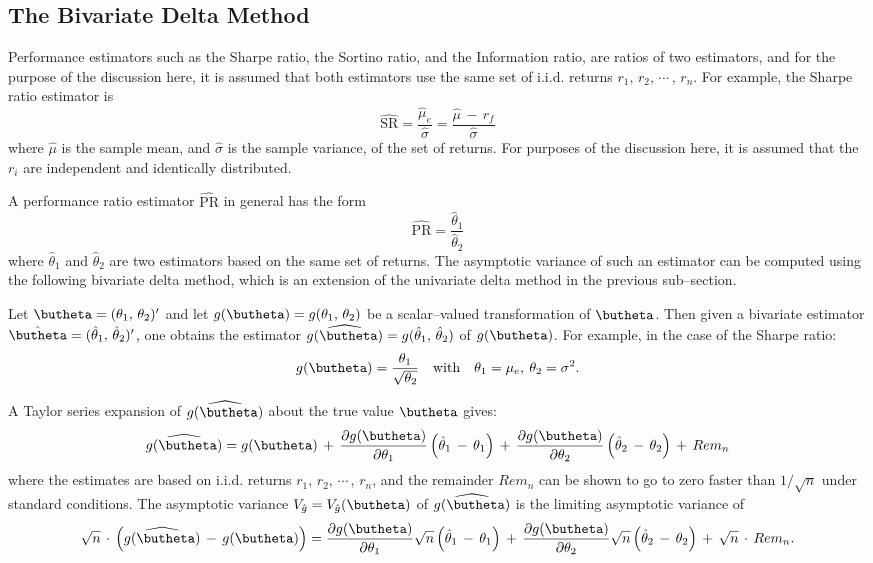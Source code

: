 \documentclass[graybox,envcountchap,sectrefs]{svmono}\usepackage[]{graphicx}\usepackage[]{xcolor}
\begin{document}
\begin{appendices}
\subsection{The Bivariate Delta Method}

Performance estimators such as the Sharpe ratio, the Sortino ratio,
and the Information ratio, are ratios of two estimators, and for the
purpose of the discussion here, it is assumed that both estimators
use the same set of i.i.d. returns $r_{1},\,r_{2},\,\cdots\,,\,r_{n}$.
For example, the Sharpe ratio estimator is
\begin{equation}
\widehat{\mathrm{SR}}=\dfrac{\hat{\mu}_{e}}{\hat{\sigma}}=\dfrac{\hat{\mu}\,-\,r_{f}}{\hat{\sigma}}\label{eq: SRestimator}
\end{equation}
where $\hat{\mu}$ is the sample mean, and $\hat{\sigma}$ is the
sample variance, of the set of returns. For purposes of the discussion
here, it is assumed that the $r_{i}$ are independent and identically
distributed.

A performance ratio estimator $\widehat{\mathrm{PR}}$ in general
has the form
\[
\widehat{\mathrm{PR}}=\dfrac{\hat{\theta}_{1}}{\hat{\theta}_{2}}
\]
where $\hat{\theta}_{1}$ and $\hat{\theta}_{2}$ are two estimators
based on the same set of returns. The asymptotic variance of such
an estimator can be computed using the following bivariate delta method,
which is an extension of the univariate delta method in the previous
sub--section.

Let $\butheta=(\theta_{1},\,\theta_{2})^{\prime}$ and let $g(\butheta)=g(\theta_{1},\,\theta_{2})$
be a scalar--valued transformation of $\butheta$. Then given a bivariate
estimator $\hat{\butheta}=(\hat{\theta}_{1},\,\hat{\theta}_{2})^{\prime}$,
one obtains the estimator $\widehat{g(\butheta)}=g(\hat{\theta}_{1},\,\hat{\theta}_{2})$
of $g(\butheta)$. For example, in the case of the Sharpe ratio:
\begin{equation}
g(\butheta)=\dfrac{\theta_{1}}{\sqrt{\theta_{2}}}\quad\mathrm{with}\quad\theta_{1}=\mu_{e},\:\theta_{2}=\sigma^{2}.\label{eq: gThetaSharpeRatio}
\end{equation}

A Taylor series expansion of $\widehat{g(\butheta)}$ about the true
value $\butheta$ gives:
\[
\widehat{g(\butheta)}=g(\butheta)\,+\,\dfrac{\partial g(\butheta)}{\partial\theta_{1}}\left(\hat{\theta}_{1}\,-\,\theta_{1}\right)\,+\,\dfrac{\partial g(\butheta)}{\partial\theta_{2}}\left(\hat{\theta}_{2}\,-\,\theta_{2}\right)\,+\,Rem_{n}
\]
where the estimates are based on i.i.d. returns $r_{1},\,r_{2},\,\cdots\,,\,r_{n}$,
and the remainder $Rem_{n}$ can be shown to go to zero faster than
$1/\sqrt{n}$ under standard conditions. The asymptotic variance $V_{\hat{g}}=V_{\hat{g}}(\butheta)$
of $\widehat{g(\butheta)}$ is the limiting asymptotic variance of
\[
\sqrt{n}\,\cdot\,\left(\widehat{g(\butheta)}\,-\,g(\butheta)\right)=\dfrac{\partial g(\butheta)}{\partial\theta_{1}}\sqrt{n}\left(\hat{\theta}_{1}\,-\,\theta_{1}\right)\,+\,\dfrac{\partial g(\butheta)}{\partial\theta_{2}}\sqrt{n}\left(\hat{\theta}_{2}\,-\,\theta_{2}\right)\,+\,\sqrt{n}\,\cdot\,Rem_{n}.
\]


\end{appendices}
\end{document}
